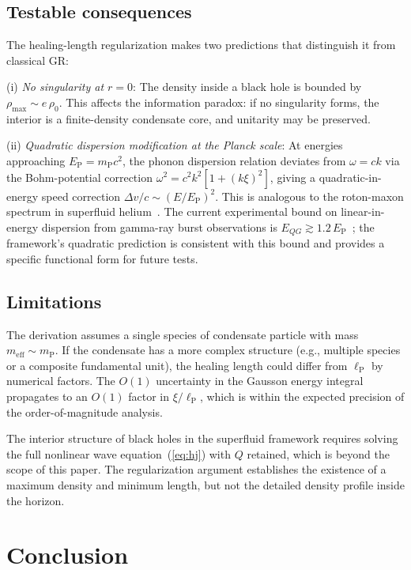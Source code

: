 \documentclass[12pt, a4paper]{article}
\newcommand{\meff}{m_{\mathrm{eff}}}
\newcommand{\lP}{\ell_{\mathrm{P}}}
\newcommand{\mP}{m_{\mathrm{P}}}
\begin{document}
\subsection{Testable consequences}

The healing-length regularization makes two
predictions that distinguish it from classical GR:

(i) \emph{No singularity at $r = 0$}: The density
inside a black hole is bounded by
$\rho_{\max} \sim e\,\rho_0$. This affects the
information paradox: if no singularity forms, the
interior is a finite-density condensate core, and
unitarity may be preserved.

(ii) \emph{Quadratic dispersion modification at the Planck scale}:
At energies approaching $E_{\mathrm{P}} = \mP c^2$,
the phonon dispersion relation deviates from
$\omega = c k$ via the Bohm-potential correction
$\omega^2 = c^2 k^2[1 + (k\xi)^2]$, giving a
quadratic-in-energy speed correction
$\Delta v/c \sim (E/E_{\mathrm{P}})^2$. This is
analogous to the roton-maxon spectrum in superfluid
helium~\cite{landau_1947}. The current experimental
bound on linear-in-energy dispersion from gamma-ray
burst observations is $E_{QG} \gtrsim 1.2\,E_{\mathrm{P}}$~\cite{amelino_2013};
the framework's quadratic prediction is consistent
with this bound and provides a specific functional
form for future tests.

\subsection{Limitations}

The derivation assumes a single species of condensate
particle with mass $\meff \sim \mP$. If the condensate
has a more complex structure (e.g., multiple species
or a composite fundamental unit), the healing length
could differ from $\lP$ by numerical factors. The $O(1)$ uncertainty in the Gausson energy integral
propagates to an $O(1)$ factor in $\xi/\lP$,
which is within the expected precision of the
order-of-magnitude analysis.

The interior structure of black holes in the
superfluid framework requires solving the full
nonlinear wave equation~(\ref{eq:hj}) with $Q$
retained, which is beyond the scope of this paper.
The regularization argument establishes the existence
of a maximum density and minimum length, but not the
detailed density profile inside the horizon.


\section{Conclusion}
\label{sec:conclusion}
\end{document}
